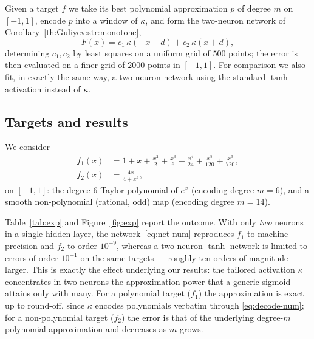 Given a target $f$ we take its best polynomial approximation $p$ of degree $m$ on
$[-1,1]$, encode $p$ into a window of $\kappa$, and form the two-neuron network of
Corollary~\ref{th:Guliyev:str:monotone},
\begin{equation}\label{eq:net-num}
  F(x)=c_1\,\kappa(-x-d)+c_2\,\kappa(x+d),
\end{equation}
determining $c_1,c_2$ by least squares on a uniform grid of $500$ points; the
error is then evaluated on a finer grid of $2000$ points in $[-1,1]$. For
comparison we also fit, in exactly the same way, a two-neuron network using the
standard $\tanh$ activation instead of $\kappa$.

\subsection{Targets and results}

We consider
\begin{align}
  f_1(x) &= 1+x+\tfrac{x^{2}}{2}+\tfrac{x^{3}}{6}+\tfrac{x^{4}}{24}
            +\tfrac{x^{5}}{120}+\tfrac{x^{6}}{720},\label{eq:f1num}\\[2pt]
  f_2(x) &= \frac{4x}{4+x^{2}},\label{eq:f2num}
\end{align}
on $[-1,1]$: the degree-$6$ Taylor polynomial of $e^{x}$ (encoding degree
$m=6$), and a smooth non-polynomial (rational, odd) map (encoding degree $m=14$).

Table~\ref{tab:exp} and Figure~\ref{fig:exp} report the outcome. With only
\emph{two} neurons in a single hidden layer, the network~\eqref{eq:net-num}
reproduces $f_1$ to machine precision and $f_2$ to order $10^{-9}$, whereas a
two-neuron $\tanh$ network is limited to errors of order $10^{-1}$ on the same
targets --- roughly ten orders of magnitude larger. This is exactly the effect
underlying our results: the tailored activation $\kappa$ concentrates in two
neurons the approximation power that a generic sigmoid attains only with many.
For a polynomial target ($f_1$) the approximation is exact up to round-off, since
$\kappa$ encodes polynomials verbatim through \eqref{eq:decode-num}; for a
non-polynomial target ($f_2$) the error is that of the underlying degree-$m$
polynomial approximation and decreases as $m$ grows.

